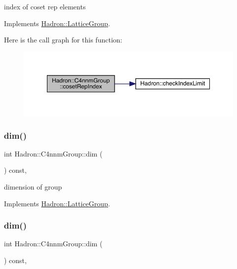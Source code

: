 index of coset rep elements 

Implements \mbox{\hyperlink{structHadron_1_1LatticeGroup_a7e3b9b5e2f596e6c40d64aa939a3ad6c}{Hadron\+::\+Lattice\+Group}}.

Here is the call graph for this function\+:
\nopagebreak
\begin{figure}[H]
\begin{center}
\leavevmode
\includegraphics[width=350pt]{d1/dba/structHadron_1_1C4nnmGroup_a413031d9855013b22c493696c69a2c4d_cgraph}
\end{center}
\end{figure}
\mbox{\label{structHadron_1_1C4nnmGroup_ab40f44381ee83db2364e43bc2c3521e4}} 
\subsubsection{\texorpdfstring{dim()}{dim()}\hspace{0.1cm}{\footnotesize\ttfamily [1/2]}}
{\footnotesize\ttfamily int Hadron\+::\+C4nnm\+Group\+::dim (\begin{DoxyParamCaption}{ }\end{DoxyParamCaption}) const\hspace{0.3cm}{\ttfamily [inline]}, {\ttfamily [virtual]}}

dimension of group 

Implements \mbox{\hyperlink{structHadron_1_1LatticeGroup_abd8415698323796ef6a8605796ee3bea}{Hadron\+::\+Lattice\+Group}}.

\mbox{\label{structHadron_1_1C4nnmGroup_ab40f44381ee83db2364e43bc2c3521e4}} 
\subsubsection{\texorpdfstring{dim()}{dim()}\hspace{0.1cm}{\footnotesize\ttfamily [2/2]}}
{\footnotesize\ttfamily int Hadron\+::\+C4nnm\+Group\+::dim (\begin{DoxyParamCaption}{ }\end{DoxyParamCaption}) const\hspace{0.3cm}{\ttfamily [inline]}, {\ttfamily [virtual]}}

